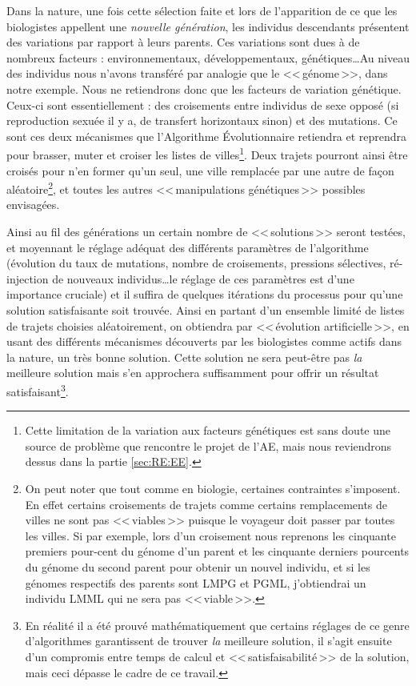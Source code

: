 Dans la nature, une fois cette sélection faite et lors de l'apparition de ce que les biologistes appellent une \emph{nouvelle génération}, les individus descendants présentent des variations par rapport à leurs parents. Ces variations sont dues à de nombreux facteurs : environnementaux, développementaux, génétiques\ldots Au niveau des individus nous n'avons transféré par analogie que le <<\,génome\,>>, dans notre exemple. Nous ne retiendrons donc que les facteurs de variation génétique. Ceux-ci sont essentiellement : des croisements entre individus de sexe opposé (si reproduction sexuée il y a, de transfert horizontaux sinon) et des mutations. Ce sont ces deux mécanismes que l'Algorithme Évolutionnaire retiendra et reprendra pour brasser, muter et  croiser les listes de villes\footnote{Cette limitation de la variation aux facteurs génétiques est sans doute une source de problème que rencontre le projet de l'AE, mais nous reviendrons dessus dans la partie \ref{sec:RE:EE}.}. Deux trajets pourront ainsi être croisés pour n'en former qu'un seul, une ville remplacée par une autre de façon aléatoire\footnote{On peut noter que tout comme en biologie, certaines contraintes s'imposent. En effet certains croisements de trajets comme certains remplacements de villes ne sont pas <<\,viables\,>> puisque le voyageur doit passer par toutes les villes. Si par exemple, lors d'un croisement nous reprenons les cinquante premiers pour-cent du génome d'un parent et les cinquante derniers pourcents du génome du second parent pour obtenir un nouvel individu, et si les génomes respectifs des parents sont LMPG et PGML, j'obtiendrai un individu LMML qui ne sera pas <<\,viable\,>>.}, et toutes les autres <<\,manipulations génétiques\,>> possibles envisagées.

Ainsi au fil des générations un certain nombre de <<\,solutions\,>> seront testées, et moyennant le réglage adéquat des différents paramètres de l'algorithme (évolution du taux de mutations, nombre de croisements, pressions sélectives, ré-injection de nouveaux individus\ldots le réglage de ces paramètres est d'une importance cruciale) et il suffira de quelques itérations du processus pour qu'une solution satisfaisante soit trouvée. Ainsi en partant d'un ensemble limité de listes de trajets choisies aléatoirement, on obtiendra par <<\,évolution artificielle\,>>, en usant des différents mécanismes découverts par les biologistes comme actifs dans la nature, un très bonne solution. Cette solution ne sera peut-être pas \emph{la} meilleure solution mais s'en approchera suffisamment pour offrir un résultat satisfaisant\footnote{En réalité il a été prouvé mathématiquement que certains réglages de ce genre d'algorithmes garantissent de trouver \emph{la} meilleure solution, il s'agit ensuite d'un compromis entre temps de calcul et <<\,satisfaisabilité\,>> de la solution, mais ceci dépasse le cadre de ce travail.}.

